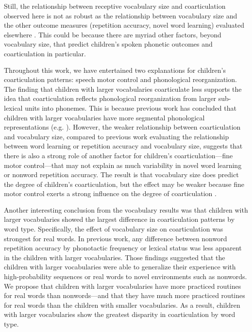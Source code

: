 \documentclass[a4paper,man,natbib,donotrepeattitle, apacite]{apa6}
\begin{document}
Still, the relationship between receptive vocabulary size and coarticulation observed here is not as robust as the relationship between vocabulary size and the other outcome measures (repetition accuracy, novel word learning) evaluated elsewhere \cite{edwardsInteractionVocabularySize2004,metsalaYoungChildrenPhonological1999,storkelInfluencePartwordPhonotactic2011}. This could be because there are myriad other factors, beyond vocabulary size, that predict children’s spoken phonetic outcomes and coarticulation in particular. 

Throughout this work, we have entertained two explanations for children’s coarticulation patterns: speech motor control and phonological reorganization. The finding that children with larger vocabularies coarticulate less supports the idea that coarticulation reflects phonological reorganization from larger sub-lexical units into phonemes. This is because previous work has concluded that children with larger vocabularies have more segmental phonological representations (e.g. ). However, the weaker relationship between coarticulation and vocabulary size, compared to previous work evaluating the relationship between word learning or repetition accuracy and vocabulary size, suggests that there is also a strong role of another factor for children’s coarticulation---fine motor control---that may not explain as much variability in novel word learning or nonword repetition accuracy. The result is that vocabulary size does predict the degree of children’s coarticulation, but the effect may be weaker because fine motor control exerts a strong influence on the degree of coarticulation \cite{barbierWhatAnticipatoryCoarticulation2020}.

Another interesting conclusion from the vocabulary results was that children with larger vocabularies showed the largest difference in coarticulation patterns by word type. Specifically, the effect of vocabulary size on coarticulation was strongest for real words. In previous work, any difference between nonword repetition accuracy by phonotactic frequency \cite{edwardsInteractionVocabularySize2004} or lexical status \cite{cychoszLexicalAdvantageFouryearold2020} was less apparent in the children with larger vocabularies. Those findings suggested that the children with larger vocabularies were able to generalize their experience with high-probability sequences or real words to novel environments such as nonwords. We propose that children with larger vocabularies have more practiced routines for real words than nonwords---and that they have much more practiced routines for real words than the children with smaller vocabularies. As a result, children with larger vocabularies show the greatest disparity in coarticulation by word type. 
\end{document}
